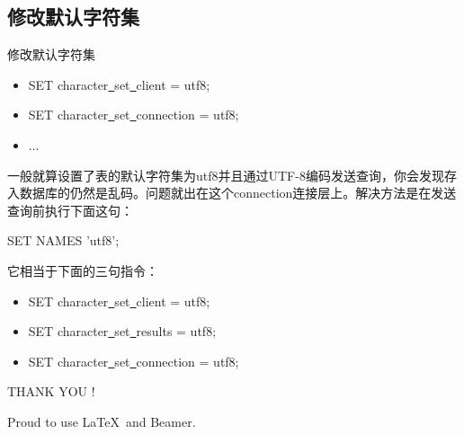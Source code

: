 \documentclass[CJK]{beamer}
\begin{document}
\begin{CJK*}{UTF8}{gbsn}
\subsection{修改默认字符集}
\begin{frame}{修改默认字符集}
	\begin{itemize}
		\item SET character\underline{\ }set\underline{\ }client = utf8;
		\item SET character\underline{\ }set\underline{\ }connection = utf8;
		\item ... 
	\end{itemize}
{\small 一般就算设置了表的默认字符集为utf8并且通过UTF-8编码发送查询，你会发现存入数据库的仍然是乱码。问题就出在这个connection连接层上。解决方法是在发送查询前执行下面这句：}
	\begin{block}{}
	SET NAMES 'utf8';	
	\end{block}
	它相当于下面的三句指令：
	\begin{block}{}
		\begin{itemize}
			\item SET character\underline{\ }set\underline{\ }client = utf8;
			\item SET character\underline{\ }set\underline{\ }results = utf8;
			\item SET character\underline{\ }set\underline{\ }connection = utf8;
		\end{itemize}
	\end{block}
\end{frame}
\begin{frame}
	\begin{center}
	{\LARGE THANK YOU !}
	\end{center}
	\begin{block}{}
	\begin{center}
	{\small Proud to use \LaTeX\ and Beamer.}
	\end{center}
	\end{block}
\end{frame}
\end{CJK*}
\end{document}
